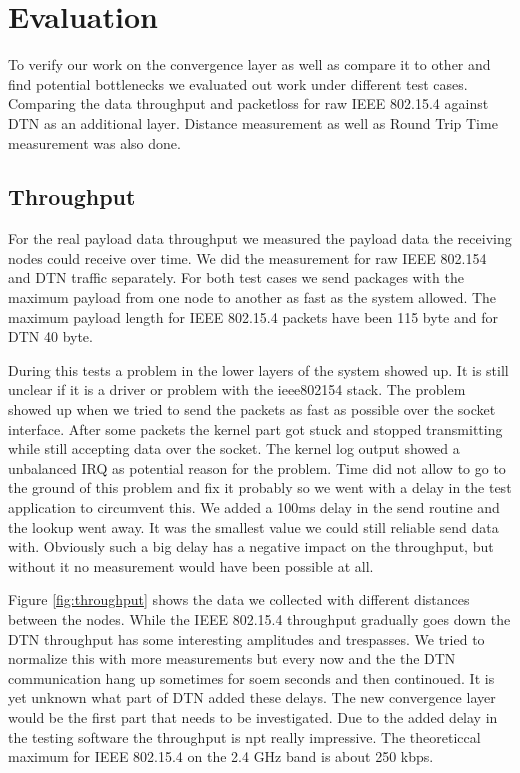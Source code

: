 \chapter{Evaluation}
To verify our work on the convergence layer as well as compare it to other and
find potential bottlenecks we evaluated out work under different test cases.
Comparing the data throughput and packetloss for raw IEEE 802.15.4 against DTN
as an additional layer. Distance measurement as well as Round Trip Time
measurement was also done.

\section{Throughput}
For the real payload data throughput we measured the payload data the receiving
nodes could receive over time. We did the measurement for raw IEEE 802.154 and
DTN traffic separately. For both test cases we send packages with the maximum
payload from one node to another as fast as the system allowed. The maximum
payload length for IEEE 802.15.4 packets have been 115 byte and for DTN 40 byte.

During this tests a problem in the lower layers of the system showed up. It is
still unclear if it is a driver or problem with the ieee802154 stack. The
problem showed up when we tried to send the packets as fast as possible over the
socket interface. After some packets the kernel part got stuck and stopped
transmitting while still accepting data over the socket. The kernel log output
showed a unbalanced IRQ as potential reason for the problem. Time did not allow
to go to the ground of this problem and fix it probably so we went with a delay
in the test application to circumvent this. We added a 100ms delay in the send
routine and the lookup went away. It was the smallest value we could still
reliable send data with. Obviously such a big delay has a negative impact on the
throughput, but without it no measurement would have been possible at all.

Figure \ref{fig:throughput} shows the data we collected with different distances between the
nodes. While the IEEE 802.15.4 throughput gradually goes down the DTN throughput
has some interesting amplitudes and trespasses. We tried to normalize this with
more measurements but every now and the  the DTN communication hang up sometimes
for soem seconds and then continoued. It is yet unknown what part of DTN added
these delays. The new convergence layer would be the first part that needs to be
investigated. Due to the added delay in the testing software the throughput is
npt really impressive. The theoreticcal maximum for IEEE 802.15.4 on the 2.4 GHz
band is about 250 kbps.


